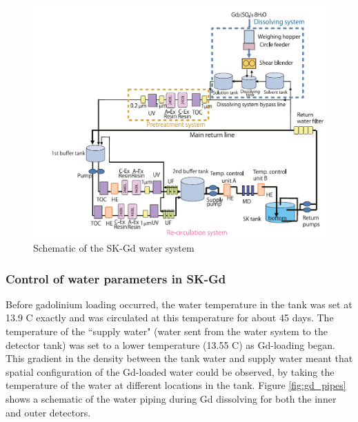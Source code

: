 \begin{figure}[H]
    \includegraphics[width=\textwidth]{Figures/skgd_water_system.png}
    \caption{Schematic of the SK-Gd water system}
\label{fig:skgd_water_system}
\end{figure}

\subsubsection{Control of water parameters in SK-Gd}

Before gadolinium loading occurred, the water temperature in the tank was set at 13.9 \degree C exactly and was circulated at this temperature for about 45 days. The temperature of the ``supply water" (water sent from the water system to the detector tank) was set to a lower temperature (13.55 \degree C) as Gd-loading began. This gradient in the density between the tank water and supply water meant that spatial configuration of the Gd-loaded water could be observed, by taking the temperature of the water at different locations in the tank. Figure \ref{fig:gd_pipes} shows a schematic of the water piping during Gd dissolving for both the inner and outer detectors. 


